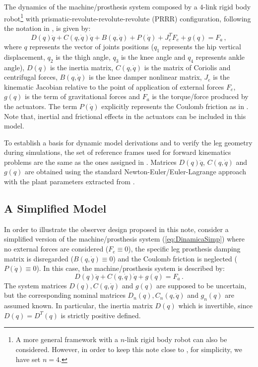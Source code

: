 \documentclass[letterpaper, 10 pt, conference]{ieeeconf}  %
\theoremstyle{plain}
\theoremstyle{definition}
\theoremstyle{remark}
\begin{document}
The dynamics of the machine/prosthesis system composed by a $4$-link rigid body robot\footnote{A more general framework with a $n$-link rigid body robot can also be considered. However, in order to keep this note close to \cite{Richter2015}, for simplicity, we have set $n=4$.} with prismatic-revolute-revolute-revolute (PRRR) configuration, following the notation in \cite{Richter2015}, is given by:
%
\begin{equation}
D(q)\ddot{q} + C(q,\dot{q})\dot{q}+B(q,\dot{q}) + P(\dot{q}) + J_e^T F_e+g(q) = F_a\,,
\label{eq:Dinamica}
\end{equation}
%
where  $q$ represents the vector of joints positions ($q_1$ represents the hip vertical displacement, $q_2$ is the thigh angle, $q_3$ is the knee angle and $q_4$ represents ankle angle), $D(q)$ is the inertia matrix, $C(q,\dot{q})$ is the matrix of Coriolis and centrifugal forces, $B(q,\dot{q})$ is the knee  damper nonlinear matrix, $J_e$ is the kinematic Jacobian relative to the point of application of external forces $F_e$, $g(q)$ is the term of gravitational forces and $F_a$ is the torque/force produced by the actuators. The term  $P(\dot{q})$ explicitly represents the Coulomb friction as in \cite{LeeKhalil2015}. Note that, inertial and frictional effects in the actuators can be included in this model. 

To establish a basis for dynamic model derivations and to verify the leg geometry during simulations, the set of reference frames used for forward kinematics problems are the same as the ones assigned in \cite{Richter2015}. Matrices $D(q)\ddot{q}$, $C(q,\dot{q})$ and $g(q)$ are obtained using the standard Newton-Euler/Euler-Lagrange approach with the plant parameters  extracted from \cite{Richter2015}.

\subsection{A Simplified Model}


In order to illustrate the observer design proposed in this note, consider a simplified version of the machine/prosthesis system (\ref{eq:DinamicaSimp}) where no external forces are considered ($F_e \equiv 0$), the specific leg prosthesis damping matrix is disregarded ($B(q,\dot{q}) \equiv 0$) and the  Coulomb friction is neglected  ($P(\dot{q}) \equiv 0$). In this case, the machine/prosthesis system is described by:
%
\begin{equation}
D(q)\ddot{q} + C(q,\dot{q})\dot{q}+g(q) = F_a\,.
\label{eq:DinamicaSimp}
\end{equation}
%
The system matrices $D(q), C(q,\dot{q})$ and $g(q)$ are supposed to be uncertain, but the corresponding nominal matrices  $D_n(q), C_n(q,\dot{q})$ and $g_n(q)$ are assumed known. In particular, the inertia matrix $D(q)$ which is invertible, since $D(q)=D^T(q)$ is strictly positive defined.
\end{document}
